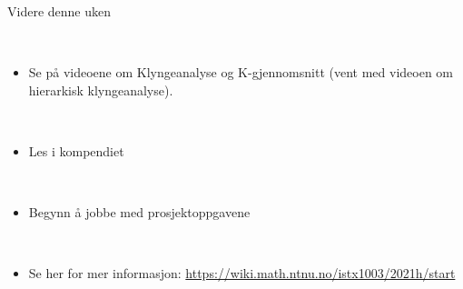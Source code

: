 \documentclass[10pt,ignorenonframetext,]{beamer}
\providecommand{\tightlist}{%
  \setlength{\itemsep}{0pt}\setlength{\parskip}{0pt}}
\begin{document}
\begin{frame}{Videre denne uken}
\protect\hypertarget{videre-denne-uken}{}

\(~\)

\begin{itemize}
\tightlist
\item
  Se på videoene om Klyngeanalyse og K-gjennomsnitt (vent med videoen om
  hierarkisk klyngeanalyse).
\end{itemize}

\(~\)

\begin{itemize}
\tightlist
\item
  Les i kompendiet
\end{itemize}

\(~\)

\begin{itemize}
\tightlist
\item
  Begynn å jobbe med prosjektoppgavene
\end{itemize}

\(~\)

\begin{itemize}
\tightlist
\item
  Se her for mer informasjon:
  \url{https://wiki.math.ntnu.no/istx1003/2021h/start}
\end{itemize}

\end{frame}
\end{document}
